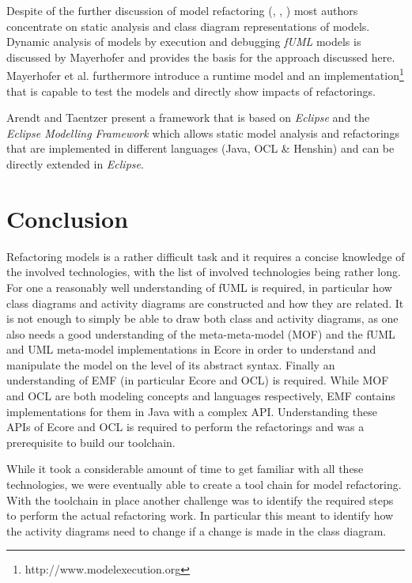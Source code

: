 \documentclass{llncs}
\begin{document}

Despite of the further discussion of model refactoring (\cite{DBLP:conf/uml/CorreaW04}, \cite{DBLP:conf/ershov/BaarM06},
\cite{DBLP:journals/ase/ArendtT13}) most authors concentrate on static analysis and class diagram representations of
models. Dynamic analysis of models by execution and debugging \textit{fUML} models is discussed by Mayerhofer
\cite{DBLP:conf/icse/Mayerhofer12} and provides the basis for the approach discussed here. Mayerhofer et al.
\cite{DBLP:conf/models/MayerhoferLK12} furthermore introduce a runtime model and an
implementation\footnote{http://www.modelexecution.org} that is capable to test the models and directly show impacts of
refactorings.


Arendt and Taentzer \cite{DBLP:journals/ase/ArendtT13} present a framework that is based on \textit{Eclipse} and the
\textit{Eclipse Modelling Framework} which allows static model analysis and refactorings that are implemented in
different languages (Java, OCL \& Henshin) and can be directly extended in \textit{Eclipse}.


\section{Conclusion}
\label{sec:conclusion}
Refactoring models is a rather difficult task and it requires a concise knowledge of the involved technologies, with
the list of involved technologies being rather long. For one a reasonably well understanding of fUML is required, in
particular how class diagrams and activity diagrams are constructed and how they are related. It is not enough to simply
be able to draw both class and activity diagrams, as one also needs a good understanding of the meta-meta-model (MOF) and
the fUML and UML meta-model implementations in Ecore in order to understand and manipulate the model on the level of its 
abstract syntax. Finally an understanding of EMF (in particular Ecore and OCL) is required. While MOF and OCL are both 
modeling concepts and languages respectively, EMF contains implementations for them in Java with a complex API. 
Understanding these APIs of Ecore and OCL is required to perform the refactorings and was a prerequisite to build
our toolchain.

While it took a considerable amount of time to get familiar with all these technologies, we were eventually able to
create a tool chain for model refactoring. With the toolchain in place another challenge was to identify the required 
steps to perform the actual refactoring work. In particular this meant to identify how the activity diagrams need to 
change if a change is made in the class diagram.
\end{document}
